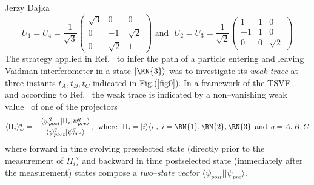 \begin{artengenv}{Jerzy Dajka}
\begin{equation}\label{bs}
U_1 = U_4 =\frac{1}{\sqrt{3}}\left( \begin{array}{ccc} \sqrt{3} & 0 & 0 \\ 0 & -1 & \sqrt{2} \\ 0 & \sqrt{2} & 1  
\end{array}\right)\,\,  \mbox{and}\,\,\,\,
U_2 = U_3 =\frac{1}{\sqrt{2}}\left( \begin{array}{ccc} 1 & 1 & 0 \\ -1 & 1 & 0 \\ 0 & 0 & \sqrt{2}  
\end{array}\right)
\end{equation}
The strategy applied  in Ref.~\parencite{PhysRevA.87.052104} to infer the path of a particle entering  and leaving Vaidman interferometer  in a state $|\RN{3}\rangle$  was to investigate its {\it weak trace}  at three instants $t_A,t_B,t_C$ indicated in Fig.(\ref{fig0}). In a framework of the TSVF~\parencite{Aharonov2008} and according to Ref.~\parencite{PhysRevA.87.052104} the weak trace is indicated by  a non--vanishing weak value~\parencite{primus,PhysRevA.95.032110} of one of the  projectors
%
\begin{eqnarray}\label{weak0}
\langle\Pi_i\rangle_w^q&=&\frac{\langle\psi_{post}^q|\Pi_i|\psi_{pre}^q\rangle}{\langle \psi_{post}^q|\psi_{pre}^q\rangle}, \,\,\,  \mbox{where}\,\,\,\,\Pi_i =  |i\rangle\langle i|,\,\, i=\RN{1},\RN{2},\RN{3}  \,\,\,  \mbox{and} \,\,\, q=A,B,C  
\end{eqnarray}
where forward in time evolving preselected state (directly prior to the measurement of $\Pi_i$) and backward in time postselected state (immediately after the measurement) states compose  a {\it two--state vector} $\langle\psi_{post}||\psi_{pre}\rangle$. 


\end{artengenv}
